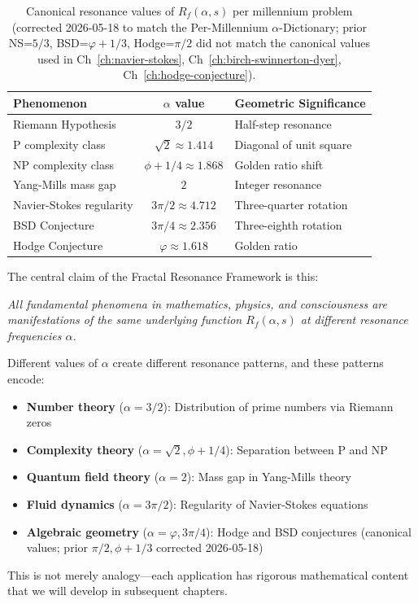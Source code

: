 \begin{center}
\begin{table}[h]
\centering
\begin{tabular}{|l|c|l|}
\hline
\textbf{Phenomenon} & \textbf{$\alpha$ value} & \textbf{Geometric Significance} \\
\hline
Riemann Hypothesis & $3/2$ & Half-step resonance \\
P complexity class & $\sqrt{2} \approx 1.414$ & Diagonal of unit square \\
NP complexity class & $\phi + 1/4 \approx 1.868$ & Golden ratio shift \\
Yang-Mills mass gap & $2$ & Integer resonance \\
Navier-Stokes regularity & $3\pi/2 \approx 4.712$ & Three-quarter rotation \\
BSD Conjecture & $3\pi/4 \approx 2.356$ & Three-eighth rotation \\
Hodge Conjecture & $\varphi \approx 1.618$ & Golden ratio \\
\hline
\end{tabular}
\caption{Canonical resonance values of $R_f(\alpha, s)$ per millennium problem (corrected 2026-05-18 to match the Per-Millennium $\alpha$-Dictionary; prior NS=$5/3$, BSD=$\varphi+1/3$, Hodge=$\pi/2$ did not match the canonical values used in Ch~\ref{ch:navier-stokes}, Ch~\ref{ch:birch-swinnerton-dyer}, Ch~\ref{ch:hodge-conjecture}).}
\label{tab:resonance-values}
\end{table}
\end{center}

\begin{keyidea}
The central claim of the Fractal Resonance Framework is this:

\textit{All fundamental phenomena in mathematics, physics, and consciousness are manifestations of the same underlying function $R_f(\alpha, s)$ at different resonance frequencies $\alpha$.}

Different values of $\alpha$ create different resonance patterns, and these patterns encode:
\begin{itemize}
\item \textbf{Number theory} ($\alpha = 3/2$): Distribution of prime numbers via Riemann zeros
\item \textbf{Complexity theory} ($\alpha = \sqrt{2}, \phi+1/4$): Separation between P and NP
\item \textbf{Quantum field theory} ($\alpha = 2$): Mass gap in Yang-Mills theory
\item \textbf{Fluid dynamics} ($\alpha = 3\pi/2$): Regularity of Navier-Stokes equations
\item \textbf{Algebraic geometry} ($\alpha = \varphi, 3\pi/4$): Hodge and BSD conjectures (canonical values; prior $\pi/2, \phi+1/3$ corrected 2026-05-18)
\end{itemize}

This is not merely analogy—each application has rigorous mathematical content that we will develop in subsequent chapters.
\end{keyidea}

